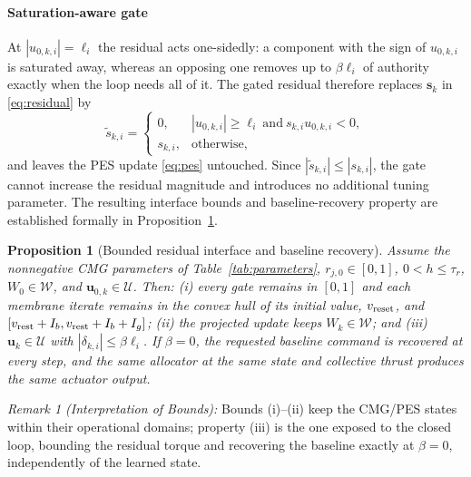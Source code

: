 \documentclass[letterpaper, 10 pt, conference]{ieeeconf}
\newtheorem{proposition}{Proposition}
\begin{document}
\paragraph{Saturation-aware gate}
At $|u_{0,k,i}|=\ell_i$ the residual acts one-sidedly: a component with the sign of $u_{0,k,i}$ is saturated away, whereas an opposing one removes up to $\beta\ell_i$ of authority exactly when the loop needs all of it. The gated residual therefore replaces $\bm s_k$ in \eqref{eq:residual} by
\begin{equation}
 \tilde s_{k,i}=\begin{cases}0,&|u_{0,k,i}|\ge\ell_i\ \text{and}\ s_{k,i}u_{0,k,i}<0,\\ s_{k,i},&\text{otherwise,}\end{cases}
 \label{eq:gate}
\end{equation}
and leaves the PES update \eqref{eq:pes} untouched. Since $|\tilde{s}_{k,i}| \le |s_{k,i}|$, the gate cannot increase
 the residual magnitude and introduces no additional tuning parameter.
 The resulting interface bounds and baseline-recovery property are
 established formally in Proposition~\ref{prop:bounded}.

\begin{proposition}[Bounded residual interface and baseline recovery]\label{prop:bounded}
Assume the nonnegative CMG parameters of Table~\ref{tab:parameters}, $r_{j,0}\in[0,1]$, $0<h\le\tau_r$, $W_0\in\mathcal W$, and $\bm u_{0,k}\in\mathcal U$. Then: (i) every gate remains in $[0,1]$ and each membrane iterate remains in the convex hull of its initial value, $v_{\rm reset}$, and $[v_{\rm rest}+I_b,v_{\rm rest}+I_b+I_g]$; (ii) the projected update keeps $W_k\in\mathcal W$; and (iii) $\bm u_k\in\mathcal U$ with $|\delta_{k,i}|\le\beta\ell_i$. If $\beta=0$, the requested baseline command is recovered at every step, and the same allocator at the same state and collective thrust produces the same actuator output.
\end{proposition}

\textit{Remark 1 (Interpretation of Bounds):}
Bounds (i)--(ii) keep the CMG/PES states within their operational domains; property (iii) is the one exposed to the closed loop, bounding the residual torque and recovering the baseline exactly at $\beta=0$, independently of the learned state.

\end{document}
